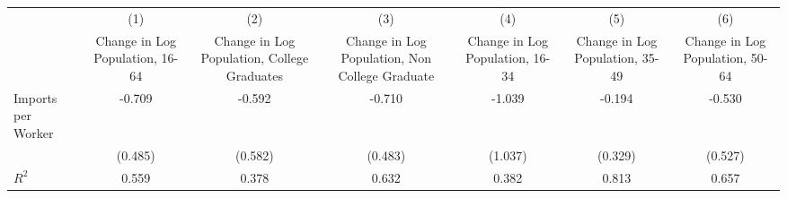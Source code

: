 {
\def\sym#1{\ifmmode^{#1}\else\(^{#1}\)\fi}
\begin{tabular}{l*{6}{c}}
\hline\hline
                    &\multicolumn{1}{c}{(1)}&\multicolumn{1}{c}{(2)}&\multicolumn{1}{c}{(3)}&\multicolumn{1}{c}{(4)}&\multicolumn{1}{c}{(5)}&\multicolumn{1}{c}{(6)}\\
                    &\multicolumn{1}{c}{Change in Log Population, 16-64}&\multicolumn{1}{c}{Change in Log Population, College Graduates}&\multicolumn{1}{c}{Change in Log Population, Non College Graduate}&\multicolumn{1}{c}{Change in Log Population, 16-34}&\multicolumn{1}{c}{Change in Log Population, 35-49}&\multicolumn{1}{c}{Change in Log Population, 50-64}\\
\hline
Imports per Worker  &      -0.709   &      -0.592   &      -0.710   &      -1.039   &      -0.194   &      -0.530   \\
                    &     (0.485)   &     (0.582)   &     (0.483)   &     (1.037)   &     (0.329)   &     (0.527)   \\
\hline
\(R^{2}\)           &       0.559   &       0.378   &       0.632   &       0.382   &       0.813   &       0.657   \\
\hline\hline
\end{tabular}
}
